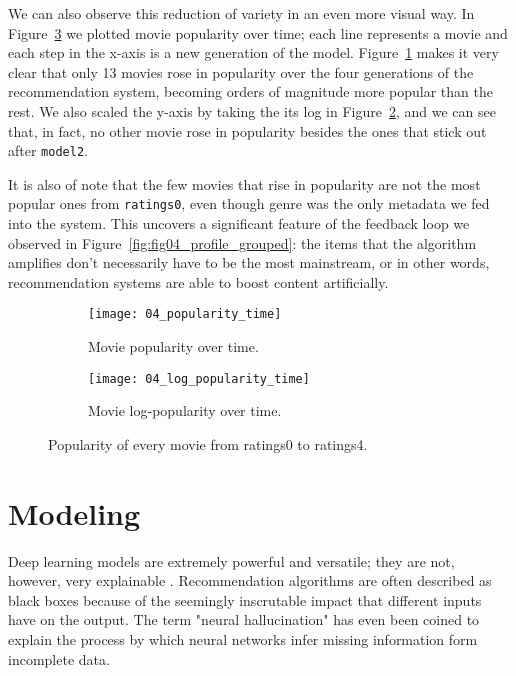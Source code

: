 We can also observe this reduction of variety in an even more visual way. In
Figure~\ref{fig:fig04_popularity_time_both} we plotted movie popularity over
time; each line represents a movie and each step in the x-axis is a new
generation of the model. Figure~\ref{fig:fig04_popularity_time} makes it very
clear that only 13 movies rose in popularity over the four generations of the
recommendation system, becoming orders of magnitude more popular than the rest.
We also scaled the y-axis by taking the its log in
Figure~\ref{fig:fig04_log_popularity_time}, and we can see that, in fact, no
other movie rose in popularity besides the ones that stick out after
\verb|model2|.

It is also of note that the few movies that rise in popularity are not the most
popular ones from \verb|ratings0|, even though genre was the only metadata we
fed into the system. This uncovers a significant feature of the feedback loop we
observed in Figure~\ref{fig:fig04_profile_grouped}: the items that the algorithm
amplifies don't necessarily have to be the most mainstream, or in other words,
recommendation systems are able to boost content artificially.

\begin{figure}
  \centering
  \begin{subfigure}{0.45\textwidth}
    \centering
    \texttt{[image: 04\_popularity\_time]}
    \caption{Movie popularity over time.\label{fig:fig04_popularity_time}}
  \end{subfigure}
  \begin{subfigure}{0.45\textwidth}
    \centering
    \texttt{[image: 04\_log\_popularity\_time]}
    \caption{Movie log-popularity over time.\label{fig:fig04_log_popularity_time}}
  \end{subfigure}
  \caption{Popularity of every movie from ratings0 to ratings4.\label{fig:fig04_popularity_time_both}}
\end{figure}

\section{Modeling}
\label{sec:modeling04}

Deep learning models are extremely powerful and versatile; they are not,
however, very explainable \citep{}. Recommendation algorithms are often
described as black boxes \citep{} because of the seemingly inscrutable impact
that different inputs have on the output. The term "neural hallucination"
\citep{} has even been coined to explain the process by which neural networks
infer missing information form incomplete data.

